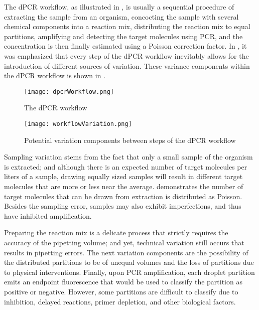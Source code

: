 The dPCR workflow, as illustrated in , is usually a sequential procedure of extracting the sample from an organism, concocting the sample with several chemical components into a reaction mix, distributing the reaction mix to equal partitions, amplifying and detecting the target molecules using PCR, and the concentration is then finally estimated using a Poisson correction factor. In \cite{Jacobs2014}, it was emphasized that every step of the dPCR workflow inevitably allows for the introduction of different sources of variation. These variance components within the dPCR workflow is shown in . 

\begin{figure}[h]
    \centering
    \texttt{[image: dpcrWorkflow.png]}
    \caption{The dPCR workflow}
        \label{fig:dpcrWorkflow}
\end{figure}

\begin{figure}[h]
    \centering
    \texttt{[image: workflowVariation.png]}
    \caption{Potential variation components between steps of the dPCR workflow}
        \label{fig:workflowVariation}
\end{figure}

Sampling variation stems from the fact that only a small sample of the organism is extracted; and although there is an expected number of target molecules per liters of a sample, drawing equally sized samples will result in different target molecules that are more or less near the average.  demonstrates the number of target molecules that can be drawn from extraction is distributed as Poisson. Besides the sampling error, samples may also exhibit imperfections, and thus have inhibited amplification. 

Preparing the reaction mix is a delicate process that strictly requires the accuracy of the pipetting volume; and yet, technical variation still occurs that results in pipetting errors. The next variation components are the possibility of the distributed partitions to be of unequal volumes and the loss of partitions due to physical interventions. Finally, upon PCR amplification, each droplet partition emits an endpoint fluorescence that would be used to classify the partition as positive or negative. However, some partitions are difficult to classify due to inhibition, delayed reactions, primer depletion, and other biological factors.

